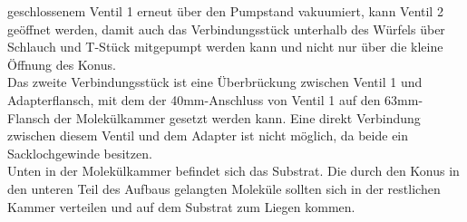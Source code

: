 geschlossenem Ventil 1 erneut über den Pumpstand vakuumiert, kann Ventil 2 geöffnet werden, damit auch das Verbindungsstück
unterhalb des Würfels über Schlauch und T-Stück mitgepumpt werden kann und nicht nur über die kleine Öffnung
des Konus.\\
Das zweite Verbindungsstück ist eine Überbrückung zwischen Ventil 1 und Adapterflansch, mit dem
der 40mm-Anschluss von Ventil 1 %
auf den 63mm-Flansch der Molekülkammer gesetzt werden kann. Eine direkt Verbindung zwischen diesem
Ventil und dem Adapter ist nicht möglich, da beide ein Sacklochgewinde besitzen.\\
Unten in der Molekülkammer befindet sich das Substrat. Die durch den Konus in den unteren Teil des Aufbaus
gelangten Moleküle sollten sich in der restlichen Kammer verteilen und auf dem Substrat zum Liegen kommen.

\FloatBarrier

